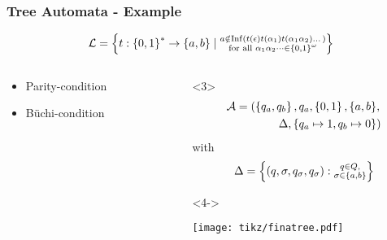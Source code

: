 \documentclass{beamer}
\begin{document}
  \begin{frame}
    \frametitle{Tree Automata - Example}
    \begin{equation*}
      \mathcal{L} = \left\{
        t:\left\{0,1\right\}^{*}\rightarrow\left\{a,b\right\}\mid\substack{
          a\notin \operatorname{Inf}(t(\epsilon)t(\alpha_{1})t(\alpha_{1}\alpha_{2})\dots)\\
          \text{for all }\alpha_{1}\alpha_{2}\dots\in\left\{0,1\right\}^{\omega} 
        }
      \right\}
    \end{equation*}
      \begin{columns}
        \begin{column}{0.4\textwidth}
          \vspace{-3cm}
          \begin{itemize}
            \item \alert<2-3>{Parity-condition} 
            \item \alert<4->{Büchi-condition} 
          \end{itemize}
        \end{column}
        \begin{column}{0.6\textwidth}
          \begin{overlayarea}{\textwidth}{0.8\textheight}
            \begin{onlyenv}<3>
              \begin{align*}
                \mathcal{A} = (\left\{q_{a}, q_{b}\right\}, q_{a}, \left\{0,1\right\}, \left\{a, b\right\}&,\\
                \Delta, \left\{q_{a}\mapsto 1, q_{b}\mapsto 0\right\}&)
              \end{align*}
              with
              \begin{equation*}
                \Delta = \left\{
                  \left(q, \sigma, q_{\sigma}, q_{\sigma}\right):\substack{
                    q\in Q,\\
                    \sigma\in\left\{a,b\right\}
                  }
                \right\}
              \end{equation*}
            \end{onlyenv}
            \begin{onlyenv}<4->
              \begin{center}
                  \texttt{[image: tikz/finatree.pdf]}
              \end{center}
            \end{onlyenv}
          \end{overlayarea}
        \end{column}
      \end{columns}
  \end{frame}
\end{document}
